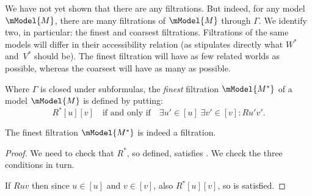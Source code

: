 \documentclass[../../../include/open-logic-section]{subfiles}
\begin{document}

We have not yet shown that there are any filtrations. But indeed, for
any model $\mModel{M}$, there are many filtrations of $\mModel{M}$
through $\Gamma$. We identify two, in particular: the finest and
coarsest filtrations. Filtrations of the same models will differ in
their accessibility relation (as  stipulates
directly what $W^*$ and~$V^*$ should be). The finest filtration
will have as few related worlds as possible, whereas the coarsest will
have as many as possible.

\begin{defn}
  Where $\Gamma$ is closed under subformulas, the \emph{finest}
  filtration $\mModel{M^*}$ of a model $\mModel{M}$ is defined by putting:
  \[
  R^*[u][v] \quad \text{if and only if} \quad \exists u'\in [u] \;
  \exists v' \in [v] : Ru'v'.
  \]
\end{defn}

\begin{prop}
  The finest filtration $\mModel{M^*}$ is indeed a filtration. 
\end{prop}

\begin{proof}
  We need to check that $R^*$, so defined, satisfies
  . We check
  the three conditions in turn.

  If $Ruv$ then since $u \in [u]$ and $v \in [v]$, also $R^*[u][v]$,
  so  is satisfied.
  
  
\end{proof}
\end{document}
